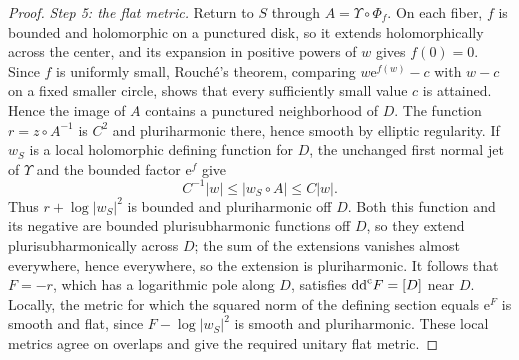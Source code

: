 \begin{proof}
\emph{Step 5: the flat metric.} Return to $S$ through $A=\Upsilon\circ\Phi_f$. On each fiber, $f$ is bounded and holomorphic on a punctured disk, so it extends holomorphically across the center, and its expansion in positive powers of $w$ gives $f(0)=0$. Since $f$ is uniformly small, Rouch\'e's theorem, comparing $w\mathrm e^{f(w)}-c$ with $w-c$ on a fixed smaller circle, shows that every sufficiently small value $c$ is attained. Hence the image of $A$ contains a punctured neighborhood of $D$. The function $r=z\circ A^{-1}$ is $C^2$ and pluriharmonic there, hence smooth by elliptic regularity. If $w_S$ is a local holomorphic defining function for $D$, the unchanged first normal jet of $\Upsilon$ and the bounded factor $\mathrm e^f$ give
\[
 C^{-1}|w|\leq|w_S\circ A|\leq C|w|.
\]
Thus $r+\log|w_S|^2$ is bounded and pluriharmonic off $D$. Both this function and its negative are bounded plurisubharmonic functions off $D$, so they extend plurisubharmonically across $D$; the sum of the extensions vanishes almost everywhere, hence everywhere, so the extension is pluriharmonic. It follows that $F=-r$, which has a logarithmic pole along $D$, satisfies $\mathrm{dd}^{\mathrm{c}} F=[D]$ near $D$. Locally, the metric for which the squared norm of the defining section equals $\mathrm e^{F}$ is smooth and flat, since $F-\log|w_S|^2$ is smooth and pluriharmonic. These local metrics agree on overlaps and give the required unitary flat metric.
\end{proof}

